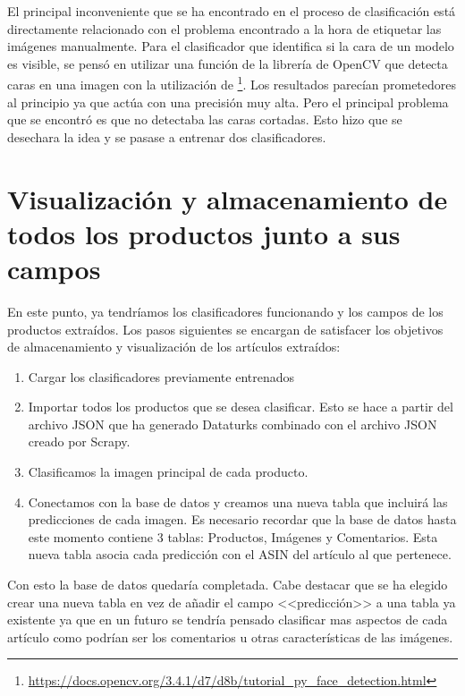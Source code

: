 El principal inconveniente que se ha encontrado en el proceso de clasificación está directamente relacionado con el problema encontrado a la hora de etiquetar las imágenes manualmente. Para el clasificador que identifica si la cara de un modelo es visible, se pensó en utilizar una función de la librería de OpenCV que detecta caras en una imagen con la utilización de \footnote{\url{https://docs.opencv.org/3.4.1/d7/d8b/tutorial_py_face_detection.html}}. Los resultados parecían prometedores al principio ya que actúa con una precisión muy alta. Pero el principal problema que se encontró es que no detectaba las caras cortadas. Esto hizo que se desechara la idea y se pasase a entrenar dos clasificadores.


\section{Visualización y almacenamiento de todos los productos junto a sus campos}

En este punto, ya tendríamos los clasificadores funcionando y los campos de los productos extraídos. Los pasos siguientes se encargan de satisfacer los objetivos de almacenamiento y visualización de los artículos extraídos:

\begin{enumerate}
    \item Cargar los clasificadores previamente entrenados
    \item Importar todos los productos que se desea clasificar. Esto se hace a partir del archivo JSON que ha generado Dataturks combinado con el archivo JSON creado por Scrapy.
    \item Clasificamos la imagen  principal de cada producto.
    \item Conectamos con la base de datos y creamos una nueva tabla que incluirá las predicciones de cada imagen. Es necesario recordar que la base de datos hasta este momento contiene 3 tablas: Productos, Imágenes y Comentarios. Esta nueva tabla asocia cada predicción con el ASIN del artículo al que pertenece.
\end{enumerate}

Con esto la base de datos quedaría completada. Cabe destacar que se ha elegido crear una nueva tabla en vez de añadir el campo <<predicción>> a una tabla ya existente ya que en un futuro se tendría pensado clasificar mas aspectos de cada artículo como podrían ser los comentarios u otras características de las imágenes.

